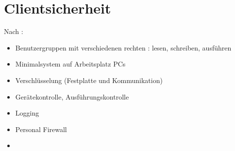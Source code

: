 \section*{Clientsicherheit}
Nach \cite{isi-client}: 
\begin{itemize}
  \item Benutzergruppen mit verschiedenen rechten : lesen, schreiben, ausführen 
  \item Minimalsystem auf Arbeitsplatz PCs
  \item Verschlüsselung (Festplatte und Kommunikation)
  \item Gerätekontrolle, Ausführungskontrolle
  \item  Logging
  \item Personal Firewall
  \item 
\end{itemize}


